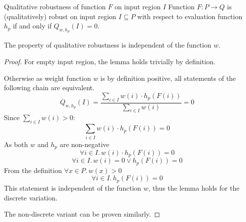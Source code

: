 \begin{definition}{Qualitative robustness of function $F$ on input region $I$}
    Function $F : P\to Q$ is (qualitatively) robust on input region $I\subseteq P$
    with respect to evaluation function $h_p$
    if and only if $Q_{w, h_p}(I) = 0$.
\end{definition}

\begin{lemma}{The property of qualitative robustness is independent of the function $w$.}%
    \label{lemma:robustness_independence_of_weight}
    \begin{proof}
        For empty input region, the lemma holds trivially by definition.

        Otherwise as weight function $w$ is by definition positive,
        all statements of the following chain are equivalent.
        \begin{equation*}
            Q_{w, h_p}(I) = \frac{\sum_{i\in I} w(i)\cdot h_p(F(i))}{\sum_{i\in I} w(i)} = 0
        \end{equation*}
        Since $\sum_{i\in I} w(i) > 0$:
        \begin{equation*}
            \sum_{i\in I} w(i)\cdot h_p(F(i)) = 0
        \end{equation*}
        As both $w$ and $h_p$ are non-negative
        \begin{equation*}
            \forall i\in I. \, w(i)\cdot h_p(F(i)) = 0
        \end{equation*}
        \begin{equation*}
            \forall i\in I. \, w(i) = 0 \vee h_p(F(i)) = 0
        \end{equation*}
        From the definition $\forall x\in P.\, w(x) > 0$
        \begin{equation*}
            \forall i\in I. \, h_p(F(i)) = 0
        \end{equation*}
        This statement is independent of the function $w$,
        thus the lemma holds for the discrete variation.

        The non-discrete variant can be proven similarly.
    \end{proof}
\end{lemma}

